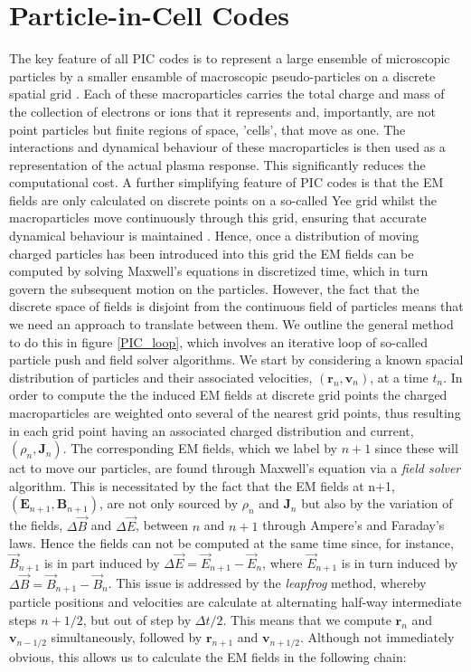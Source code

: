 \section{Particle-in-Cell Codes}
\label{sec:Particle-in-Cell Codes}
The key feature of all PIC codes is to represent a large ensemble of microscopic particles by a smaller ensamble of macroscopic pseudo-particles on a discrete spatial grid \cite{Pukhov2015}. Each of these macroparticles carries the total charge and mass of the collection of electrons or ions that it represents and, importantly, are not point particles but finite regions of space, 'cells', that move as one. The interactions and dynamical behaviour of these macroparticles is then used as a representation of the actual plasma response. This significantly reduces the computational cost. A further simplifying feature of PIC codes is that the EM fields are only calculated on discrete points on a so-called Yee grid whilst the macroparticles move continuously through this grid, ensuring that accurate dynamical behaviour is maintained \cite{Lawrence-Douglas2013}. Hence, once a distribution of moving charged particles has been introduced into this grid the EM fields can be computed by solving Maxwell's equations in discretized time, which in turn govern the subsequent motion on the particles. However, the fact that the discrete space of fields is disjoint from the continuous field of particles means that we need an approach to translate between them. We outline the general method to do this in figure \ref{PIC_loop}, which involves an iterative loop of so-called particle push and field solver algorithms. We start by considering a known spacial distribution of particles and their associated velocities, $\left(\boldsymbol{r}_{n},\boldsymbol{v}_{n}\right)$, at a time $t_n$. In order to compute the the induced EM fields at discrete grid points the charged macroparticles are weighted onto several of the nearest grid points, thus resulting in each grid point having an associated charged distribution and current, $\left(\rho_{n},\boldsymbol{J}_{n}\right)$. The corresponding EM fields, which we label by $n+1$ since these will act to move our particles, are found through Maxwell's equation via a \textit{field solver} algorithm. This is necessitated by the fact that the EM fields at n+1, $\left(\boldsymbol{E}_{n+1},\boldsymbol{B}_{n+1}\right)$, are not only sourced by $\rho_{n}$ and $\boldsymbol{J}_{n}$ but also by the variation of the fields, $\Delta\vec{B}$ and $\Delta\vec{E}$, between $n$ and $n+1$ through Ampere's and Faraday's laws. Hence the fields can not be computed at the same time since, for instance, $\vec{B}_{n+1 }$ is in part induced by $\Delta\vec{E}=\vec{E}_{n+1}-\vec{E}_n$, where $\vec{E}_{n+1}$ is in turn induced by $\Delta\vec{B}=\vec{B}_{n+1}-\vec{B}_n$. This issue is addressed by the \textit{leapfrog} method, whereby particle positions and velocities are calculate at alternating half-way intermediate steps $n+1/2$, but out of step by $\Delta t/2$. This means that we compute $\boldsymbol{r}_{n}$ and $\boldsymbol{v}_{n-1/2}$ simultaneously, followed by $\boldsymbol{r}_{n+1}$ and $\boldsymbol{v}_{n+1/2}$. Although not immediately obvious, this allows us to calculate the EM fields in the following chain: 